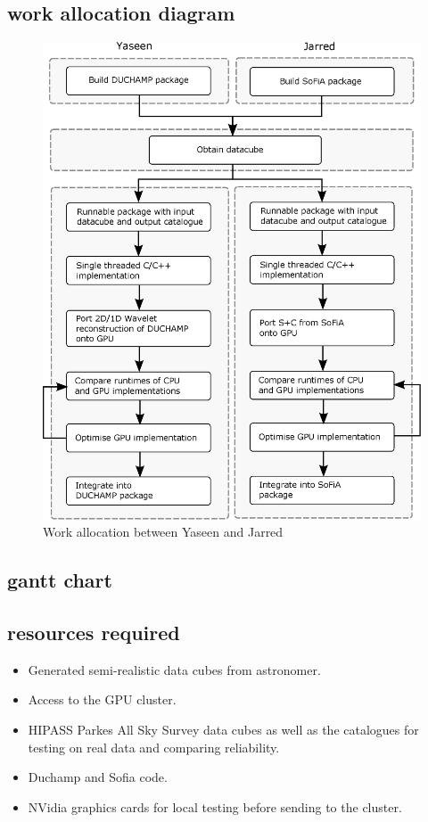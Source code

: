\documentclass[prodmode,acmtecs]{acmsmall} \usepackage[ruled]{algorithm2e}
\begin{document}
\subsection{work allocation diagram}
\begin{figure}
\centerline{\includegraphics[width=\textwidth,height=\textheight,keepaspectratio]{workallocation}}
\caption{Work allocation between Yaseen and Jarred}
\label{fig:work-allocation}
\end{figure}

\subsection{gantt chart}

\subsection{resources required}
\begin{itemize}
\item Generated semi-realistic data cubes from astronomer.
\item Access to the GPU cluster.
\item HIPASS Parkes All Sky Survey data cubes as well as the catalogues for testing on real data and comparing reliability.
\item Duchamp and Sofia code.
\item NVidia graphics cards for local testing before sending to the cluster.
\end{itemize}
\end{document}
